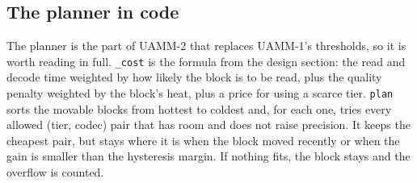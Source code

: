 \documentclass[12pt,a4paper]{report}
\begin{document}
\subsection{The planner in code}\label{sec:6_3}
The planner is the part of UAMM-2 that replaces UAMM-1's thresholds, so it is worth reading in full. \texttt{\_\allowbreak{}\allowbreak{}cost} is the formula from the design section: the read and decode time weighted by how likely the block is to be read, plus the quality penalty weighted by the block's heat, plus a price for using a scarce tier. \texttt{plan} sorts the movable blocks from hottest to coldest and, for each one, tries every allowed (tier, codec) pair that has room and does not raise precision. It keeps the cheapest pair, but stays where it is when the block moved recently or when the gain is smaller than the hysteresis margin. If nothing fits, the block stays and the overflow is counted.
\end{document}
